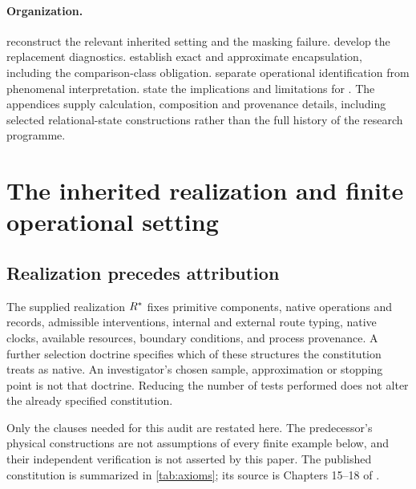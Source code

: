 \paragraph{Organization.}
 reconstruct the relevant inherited setting and the masking failure.  develop the replacement diagnostics.  establish exact and approximate encapsulation, including the comparison-class obligation.  separate operational identification from phenomenal interpretation.  state the implications and limitations for \SPC. The appendices supply calculation, composition and provenance details, including selected relational-state constructions rather than the full history of the research programme.



\section{The inherited realization and finite operational setting}\label{sec:setting}
\subsection{Realization precedes attribution}
The supplied realization \(R^{\ast}\) fixes primitive components, native operations and records, admissible interventions, internal and external route typing, native clocks, available resources, boundary conditions, and process provenance. A further selection doctrine specifies which of these structures the constitution treats as native. An investigator's chosen sample, approximation or stopping point is not that doctrine. Reducing the number of tests performed does not alter the already specified constitution.

Only the clauses needed for this audit are restated here. The predecessor's physical constructions are not assumptions of every finite example below, and their independent verification is not asserted by this paper. The published constitution is summarized in \cref{tab:axioms}; its source is Chapters 15--18 of \cite{RodgersSPC2}.

